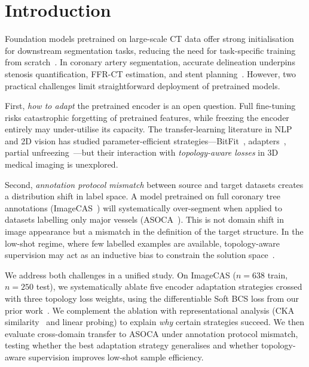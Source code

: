 \documentclass[runningheads]{llncs}
\begin{document}
\section{Introduction}

Foundation models pretrained on large-scale CT data offer strong initialisation for downstream segmentation tasks, reducing the need for task-specific training from scratch~\cite{pai_ctfm_2025,huang_stu_2023}.
In coronary artery segmentation, accurate delineation underpins stenosis quantification, FFR-CT estimation, and stent planning~\cite{lin_deep_2022}.
However, two practical challenges limit straightforward deployment of pretrained models.

First, \emph{how to adapt} the pretrained encoder is an open question.
Full fine-tuning risks catastrophic forgetting of pretrained features, while freezing the encoder entirely may under-utilise its capacity.
The transfer-learning literature in NLP and 2D vision has studied parameter-efficient strategies---BitFit~\cite{zaken_bitfit_2022}, adapters~\cite{houlsby_adapters_2019}, partial unfreezing~\cite{lee_surgical_2023}---but their interaction with \emph{topology-aware losses} in 3D medical imaging is unexplored.

Second, \emph{annotation protocol mismatch} between source and target datasets creates a distribution shift in label space.
A model pretrained on full coronary tree annotations (ImageCAS~\cite{zeng_imagecas_2023}) will systematically over-segment when applied to datasets labelling only major vessels (ASOCA~\cite{gharleghi_asoca_2022}).
This is not domain shift in image appearance but a mismatch in the definition of the target structure.
In the low-shot regime, where few labelled examples are available, topology-aware supervision may act as an inductive bias to constrain the solution space~\cite{shit_cldice_2021,hu_topology_2019,clough_topological_2022}.

We address both challenges in a unified study.
On ImageCAS ($n{=}638$ train, $n{=}250$ test), we systematically ablate five encoder adaptation strategies crossed with three topology loss weights, using the differentiable Soft BCS loss from our prior work~\cite{anonymous_bcs_2026}.
We complement the ablation with representational analysis (CKA similarity~\cite{kornblith_cka_2019} and linear probing) to explain \emph{why} certain strategies succeed.
We then evaluate cross-domain transfer to ASOCA under annotation protocol mismatch, testing whether the best adaptation strategy generalises and whether topology-aware supervision improves low-shot sample efficiency.
\end{document}
